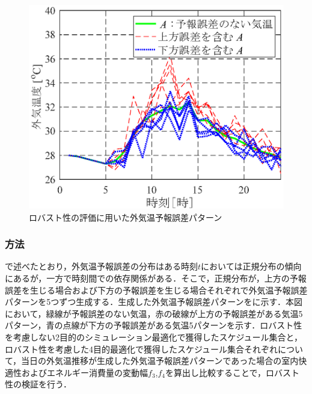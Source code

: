 \begin{figure}[ht]
    \begin{center}
        \includegraphics[width=0.7\linewidth]{fig/robust_outside_temp_10.eps}
    \end{center}
    \caption{ロバスト性の評価に用いた外気温予報誤差パターン}
    \label{fig::robust_outside_temp_10}
\end{figure}

\subsubsection{方法}
で述べたとおり，外気温予報誤差の分布はある時刻$t$においては正規分布の傾向にあるが，一方で時刻間での依存関係がある．そこで，正規分布が，上方の予報誤差を生じる場合および下方の予報誤差を生じる場合それぞれで外気温予報誤差パターンを5つずつ生成する．生成した外気温予報誤差パターンをに示す．本図において，緑線が予報誤差のない気温，赤の破線が上方の予報誤差がある気温5パターン，青の点線が下方の予報誤差がある気温5パターンを示す．ロバスト性を考慮しない2目的のシミュレーション最適化で獲得したスケジュール集合と，ロバスト性を考慮した4目的最適化で獲得したスケジュール集合それぞれについて，当日の外気温推移が生成した外気温予報誤差パターンであった場合の室内快適性およびエネルギー消費量の変動幅$f_3$,$f_4$を算出し比較することで，ロバスト性の検証を行う．


